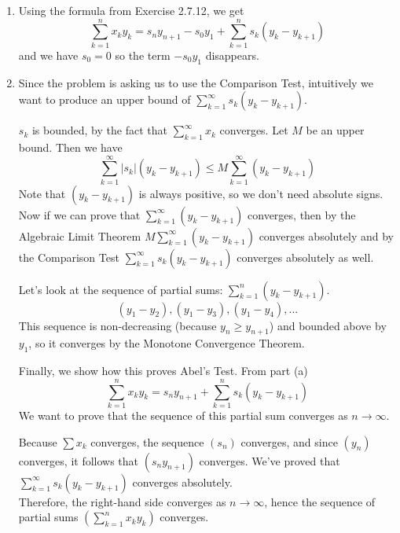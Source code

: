 \documentclass{oxmathproblems}
\begin{document}
\begin{questions}
\begin{solution}
  \begin{enumerate}[label=(\alph*)]
    \item Using the formula from Exercise 2.7.12, we get
    \[\sum_{k=1}^{n}x_{k}y_{k} = s_{n}y_{n+1} - s_{0}y_{1} + \sum_{k=1}^{n}s_{k}(y_{k}-y_{k+1})\]
    and we have $s_{0}=0$ so the term $-s_{0}y_{1}$ disappears.

    \item Since the problem is asking us to use the Comparison Test, intuitively we want to produce an upper bound of $\sum_{k=1}^{\infty}s_{k}(y_{k}-y_{k+1})$.
    
    $s_{k}$ is bounded, by the fact that $\sum_{k=1}^{\infty}x_{k}$ converges. Let $M$ be an upper bound. Then we have 
    \[\sum_{k=1}^{\infty}|s_{k}|(y_{k}-y_{k+1}) \leq M\sum_{k=1}^{\infty}(y_{k}-y_{k+1})\]
    Note that $(y_{k}-y_{k+1})$ is always positive, so we don't need absolute signs. Now if we can prove that $\sum_{k=1}^{\infty}(y_{k}-y_{k+1})$ converges, then by
    the Algebraic Limit Theorem $M\sum_{k=1}^{\infty}(y_{k}-y_{k+1})$ converges absolutely and by the Comparison Test $\sum_{k=1}^{\infty}s_{k}(y_{k}-y_{k+1})$ converges
    absolutely as well.

    Let's look at the sequence of partial sums: $\sum_{k=1}^{n}(y_{k}-y_{k+1})$.
    \[(y_{1}-y_{2}), (y_{1}-y_{3}), (y_{1}-y_{4}), ...\]
    This sequence is non-decreasing (because $y_{n} \geq y_{n+1}$) and bounded above by $y_{1}$, so it converges by the Monotone Convergence Theorem.

    Finally, we show how this proves Abel's Test. From part (a)
    \[\sum_{k=1}^{n}x_{k}y_{k} = s_{n}y_{n+1} + \sum_{k=1}^{n}s_{k}(y_{k}-y_{k+1})\]
    We want to prove that the sequence of this partial sum converges as $n \rightarrow \infty$.

    Because $\sum x_{k}$ converges, the sequence $(s_{n})$ converges, and since $(y_{n})$ converges, it follows that $(s_{n}y_{n+1})$ converges.
    We've proved that $\sum_{k=1}^{\infty}s_{k}(y_{k}-y_{k+1})$ converges absolutely.\\
    Therefore, the right-hand side converges as $n \rightarrow \infty$, hence the sequence of partial sums $(\sum_{k=1}^{n}x_{k}y_{k})$ converges.
  \end{enumerate}
\end{solution}


\end{questions}
\end{document}
